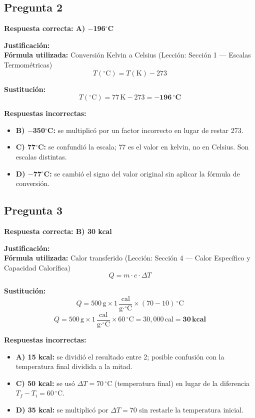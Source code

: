 \begin{respuestabox}
\subsection{Pregunta 2}
\textcolor{verdecorrecto}{\textbf{Respuesta correcta: A) $-$196$^\circ$C}}

\textbf{Justificación:}\\
\textbf{Fórmula utilizada:} Conversión Kelvin a Celsius (Lección: Sección 1 --- Escalas Termométricas)
$$T(^\circ\text{C}) = T(\text{K}) - 273$$

\textbf{Sustitución:}
$$T(^\circ\text{C}) = 77\,\text{K} - 273 = \mathbf{-196\,^\circ\text{C}}$$

\textbf{Respuestas incorrectas:}
\begin{itemize}
    \item \textbf{B) $-$350$^\circ$C:} se multiplicó por un factor incorrecto en lugar de restar 273.
    \item \textbf{C) 77$^\circ$C:} se confundió la escala; 77 es el valor en kelvin, no en Celsius. Son escalas distintas.
    \item \textbf{D) $-$77$^\circ$C:} se cambió el signo del valor original sin aplicar la fórmula de conversión.
\end{itemize}
\end{respuestabox}

\begin{respuestabox}
\subsection{Pregunta 3}
\textcolor{verdecorrecto}{\textbf{Respuesta correcta: B) 30 kcal}}

\textbf{Justificación:}\\
\textbf{Fórmula utilizada:} Calor transferido (Lección: Sección 4 --- Calor Específico y Capacidad Calorífica)
$$Q = m \cdot c \cdot \Delta T$$

\textbf{Sustitución:}
$$Q = 500\,\text{g} \times 1\,\frac{\text{cal}}{\text{g}\cdot^\circ\text{C}} \times (70 - 10)\,^\circ\text{C}$$
$$Q = 500\,\text{g} \times 1\,\frac{\text{cal}}{\text{g}\cdot^\circ\text{C}} \times 60\,^\circ\text{C} = 30{,}000\,\text{cal} = \mathbf{30\,\text{kcal}}$$

\textbf{Respuestas incorrectas:}
\begin{itemize}
    \item \textbf{A) 15 kcal:} se dividió el resultado entre 2; posible confusión con la temperatura final dividida a la mitad.
    \item \textbf{C) 50 kcal:} se usó $\Delta T = 70\,^\circ$C (temperatura final) en lugar de la diferencia $T_f - T_i = 60\,^\circ$C.
    \item \textbf{D) 35 kcal:} se multiplicó por $\Delta T = 70$ sin restarle la temperatura inicial.
\end{itemize}
\end{respuestabox}

